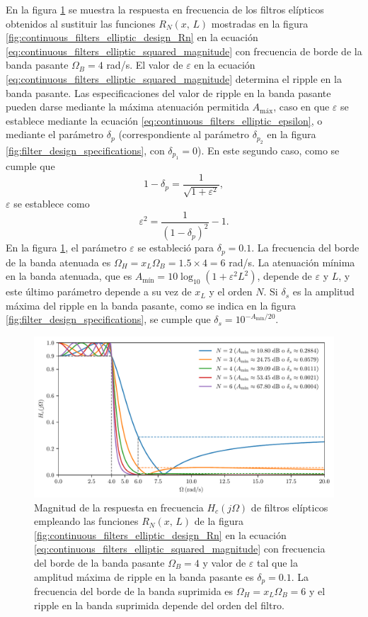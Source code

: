 \documentclass[a4paper]{report}
\begin{document}
En la figura \ref{fig:continuous_filters_elliptic_design_H} se muestra la respuesta en frecuencia de los filtros elípticos obtenidos al sustituir las funciones \(R_N(x,\,L)\) mostradas en la figura \ref{fig:continuous_filters_elliptic_design_Rn} en la ecuación \ref{eq:continuous_filters_elliptic_squared_magnitude}  con frecuencia de borde de la banda pasante \(\Omega_B=4\) rad/s. El valor de \(\varepsilon\) en la ecuación \ref{eq:continuous_filters_elliptic_squared_magnitude} determina el ripple en la banda pasante. Las especificaciones del valor de ripple en la banda pasante pueden darse mediante la máxima atenuación permitida \(A_\textrm{máx}\), caso en que \(\varepsilon\) se establece mediante la ecuación \ref{eq:continuous_filters_elliptic_epsilon}, o mediante el parámetro \(\delta_p\) (correspondiente al parámetro \(\delta_{p_2}\) en la figura \ref{fig:filter_design_specifications}, con \(\delta_{p_1}=0\)). En este segundo caso, como se cumple que
\[
 1-\delta_p=\frac{1}{\sqrt{1+\varepsilon^2}},
\]
\(\varepsilon\) se establece como
\[
 \varepsilon^2=\frac{1}{(1-\delta_p)^2}-1.
\]
En la figura \ref{fig:continuous_filters_elliptic_design_H}, el parámetro \(\varepsilon\) se estableció para \(\delta_p=0.1\). La frecuencia del borde de la banda atenuada es \(\Omega_H=x_L\Omega_B=1.5\times4=6\) rad/s. La atenuación mínima en la banda atenuada, que es \(A_\textrm{mín}=10\log_{10}(1+\varepsilon^2L^2)\), depende de \(\varepsilon\) y \(L\), y este último parámetro depende a su vez de \(x_L\) y el orden \(N\). Si \(\delta_s\) es la amplitud máxima del ripple en la banda pasante, como se indica en la figura \ref{fig:filter_design_specifications}, se cumple que \(\delta_s=10^{-A_\textrm{mín}/20}\).
\begin{figure}[!htb]
 \begin{center}
 \includegraphics[width=1\textwidth]{figuras/continuous_filters_elliptic_design_H.pdf}
 \caption{\label{fig:continuous_filters_elliptic_design_H} Magnitud de la respuesta en frecuencia \(H_c(j\Omega)\) de filtros elípticos empleando las funciones \(R_N(x,\,L)\) de la figura \ref{fig:continuous_filters_elliptic_design_Rn} en la ecuación \ref{eq:continuous_filters_elliptic_squared_magnitude} con frecuencia del borde de la banda pasante \(\Omega_B=4\) y valor de \(\varepsilon\) tal que la amplitud máxima de ripple en la banda pasante es \(\delta_p=0.1\). La frecuencia del borde de la banda suprimida es \(\Omega_H=x_L\Omega_B=6\) y el ripple en la banda suprimida depende del orden del filtro.}
 \end{center}
\end{figure}
\end{document}
